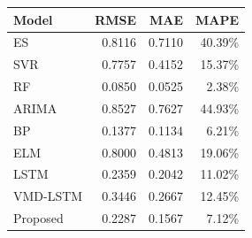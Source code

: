{\tiny\setlength{\tabcolsep}{2pt}\begin{tabular}{lrrr} \toprule
Model & RMSE & MAE & MAPE \\ \midrule
ES & 0.8116 & 0.7110 & 40.39\% \\ 
SVR & 0.7757 & 0.4152 & 15.37\% \\ 
RF & 0.0850 & 0.0525 & 2.38\% \\ 
ARIMA & 0.8527 & 0.7627 & 44.93\% \\ 
BP & 0.1377 & 0.1134 & 6.21\% \\ 
ELM & 0.8000 & 0.4813 & 19.06\% \\ 
LSTM & 0.2359 & 0.2042 & 11.02\% \\ 
VMD-LSTM & 0.3446 & 0.2667 & 12.45\% \\ 
Proposed & 0.2287 & 0.1567 & 7.12\% \\ 
\bottomrule \end{tabular}}